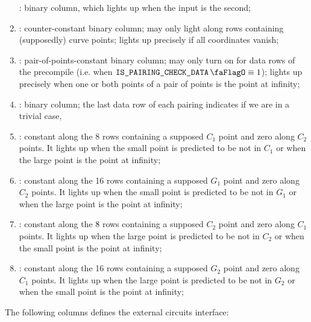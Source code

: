 \begin{enumerate}[resume]
        \isSecondInput:
        binary column, which lights up when the input is the second;
    \item
        \isInfinity:
        counter-constant binary column;
        may only light along rows containing (supposedly) curve points;
        lights up precisely if all coordinates vanish;
    \item
        \both{\pairOfPointsContainsInfinity}:
        pair-of-points-constant binary column;
        may only turn on for data rows of the  precompile (i.e. when $\isBlsPairingCheckData \equiv 1$);
        lights up precisely when one or both points of a pair of points is the point at infinity;
    \item
        \trivialAcc:
        binary column;
        the last data row of each pairing indicates if we are in a trivial case,
    \item
        \both{\cOneMembershipTestRequired}:
        constant along the 8 rows containing a supposed $C_1$ point and zero along $C_2$ points. It lights up when the small point is predicted to be not in $C_1$ or when the large point is the point at infinity;
    \item
        \both{\gOneMembershipTestRequired}:
        constant along the 16 rows containing a supposed $G_1$ point and zero along $C_2$ points. It lights up when the small point is predicted to be not in $G_1$ or when the large point is the point at infinity;
    \item
        \both{\cTwoMembershipTestRequired}:
        constant along the 8 rows containing a supposed $C_2$ point and zero along $C_1$ points. It lights up when the large point is predicted to be not in $C_2$ or when the small point is the point at infinity;
    \item
        \both{\gTwoMembershipTestRequired}:
        constant along the 16 rows containing a supposed $G_2$ point and zero along $C_1$ points. It lights up when the large point is predicted to be not in $G_2$ or when the small point is the point at infinity;
\end{enumerate}
The following columns defines the external circuits interface:

